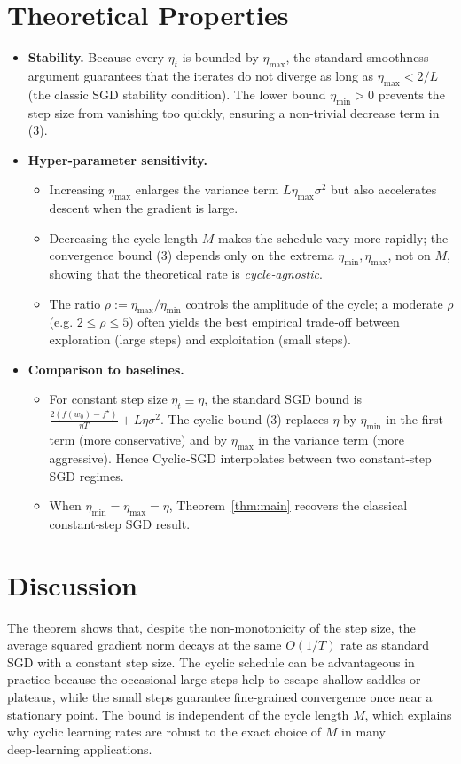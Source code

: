 \documentclass{article}
\begin{document}
\section*{Theoretical Properties}
\begin{itemize}
\item \textbf{Stability.} Because every $\eta_t$ is bounded by $\eta_{\max}$, the standard smoothness argument guarantees that the iterates do not diverge as long as $\eta_{\max}<2/L$ (the classic SGD stability condition). The lower bound $\eta_{\min}>0$ prevents the step size from vanishing too quickly, ensuring a non‑trivial decrease term in (3).

\item \textbf{Hyper‑parameter sensitivity.}
    \begin{itemize}
        \item Increasing $\eta_{\max}$ enlarges the variance term $L\eta_{\max}\sigma^{2}$ but also accelerates descent when the gradient is large.
        \item Decreasing the cycle length $M$ makes the schedule vary more rapidly; the convergence bound (3) depends only on the extrema $\eta_{\min},\eta_{\max}$, not on $M$, showing that the theoretical rate is \emph{cycle‑agnostic}.
        \item The ratio $\rho:=\eta_{\max}/\eta_{\min}$ controls the amplitude of the cycle; a moderate $\rho$ (e.g. $2\le\rho\le5$) often yields the best empirical trade‑off between exploration (large steps) and exploitation (small steps).
    \end{itemize}

\item \textbf{Comparison to baselines.}
    \begin{itemize}
        \item For constant step size $\eta_t\equiv\eta$, the standard SGD bound is $\frac{2(f(w_0)-f^{\star})}{\eta T}+L\eta\sigma^{2}$. The cyclic bound (3) replaces $\eta$ by $\eta_{\min}$ in the first term (more conservative) and by $\eta_{\max}$ in the variance term (more aggressive). Hence Cyclic‑SGD interpolates between two constant‑step SGD regimes.
        \item When $\eta_{\min}=\eta_{\max}=\eta$, Theorem~\ref{thm:main} recovers the classical constant‑step SGD result.
    \end{itemize}
\end{itemize}

\section*{Discussion}
The theorem shows that, despite the non‑monotonicity of the step size, the average squared gradient norm decays at the same $O(1/T)$ rate as standard SGD with a constant step size. The cyclic schedule can be advantageous in practice because the occasional large steps help to escape shallow saddles or plateaus, while the small steps guarantee fine‑grained convergence once near a stationary point. The bound is independent of the cycle length $M$, which explains why cyclic learning rates are robust to the exact choice of $M$ in many deep‑learning applications.
\end{document}
